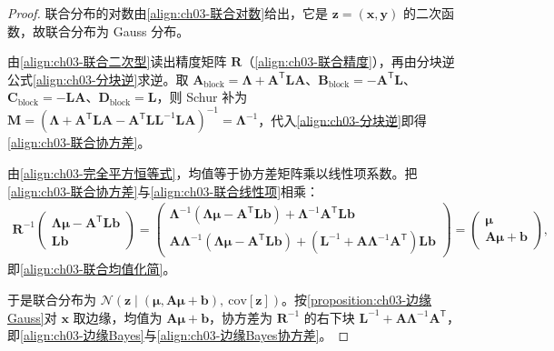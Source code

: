\documentclass[../../main.tex]{subfiles}
\begin{document}
\begin{proof}
联合分布的对数由\eqref{align:ch03-联合对数}给出，它是 $\boldsymbol{z}=(\boldsymbol{x},\boldsymbol{y})$ 的二次函数，故联合分布为 Gauss 分布。

由\eqref{align:ch03-联合二次型}读出精度矩阵 $\boldsymbol{R}$（\eqref{align:ch03-联合精度}），再由分块逆公式\eqref{align:ch03-分块逆}求逆。取 $\boldsymbol{A}_{\text{block}}=\boldsymbol{\Lambda}+\boldsymbol{A}^{\mathsf{T}}\boldsymbol{L}\boldsymbol{A}$、$\boldsymbol{B}_{\text{block}}=-\boldsymbol{A}^{\mathsf{T}}\boldsymbol{L}$、$\boldsymbol{C}_{\text{block}}=-\boldsymbol{L}\boldsymbol{A}$、$\boldsymbol{D}_{\text{block}}=\boldsymbol{L}$，则 Schur 补为 $\boldsymbol{M}=(\boldsymbol{\Lambda}+\boldsymbol{A}^{\mathsf{T}}\boldsymbol{L}\boldsymbol{A}-\boldsymbol{A}^{\mathsf{T}}\boldsymbol{L}\boldsymbol{L}^{-1}\boldsymbol{L}\boldsymbol{A})^{-1}=\boldsymbol{\Lambda}^{-1}$，代入\eqref{align:ch03-分块逆}即得\eqref{align:ch03-联合协方差}。

由\eqref{align:ch03-完全平方恒等式}，均值等于协方差矩阵乘以线性项系数。把\eqref{align:ch03-联合协方差}与\eqref{align:ch03-联合线性项}相乘：
\begin{align*}
\boldsymbol{R}^{-1}\begin{pmatrix}\boldsymbol{\Lambda}\boldsymbol{\mu}-\boldsymbol{A}^{\mathsf{T}}\boldsymbol{L}\boldsymbol{b}\\ \boldsymbol{L}\boldsymbol{b}\end{pmatrix}=\begin{pmatrix}\boldsymbol{\Lambda}^{-1}(\boldsymbol{\Lambda}\boldsymbol{\mu}-\boldsymbol{A}^{\mathsf{T}}\boldsymbol{L}\boldsymbol{b})+\boldsymbol{\Lambda}^{-1}\boldsymbol{A}^{\mathsf{T}}\boldsymbol{L}\boldsymbol{b}\\ \boldsymbol{A}\boldsymbol{\Lambda}^{-1}(\boldsymbol{\Lambda}\boldsymbol{\mu}-\boldsymbol{A}^{\mathsf{T}}\boldsymbol{L}\boldsymbol{b})+(\boldsymbol{L}^{-1}+\boldsymbol{A}\boldsymbol{\Lambda}^{-1}\boldsymbol{A}^{\mathsf{T}})\boldsymbol{L}\boldsymbol{b}\end{pmatrix}=\begin{pmatrix}\boldsymbol{\mu}\\ \boldsymbol{A}\boldsymbol{\mu}+\boldsymbol{b}\end{pmatrix},
\end{align*}
即\eqref{align:ch03-联合均值化简}。

于是联合分布为 $\mathcal{N}(\boldsymbol{z}\mid(\boldsymbol{\mu},\boldsymbol{A}\boldsymbol{\mu}+\boldsymbol{b}),\ \mathrm{cov}[\boldsymbol{z}])$。按\cref{proposition:ch03-边缘Gauss}对 $\boldsymbol{x}$ 取边缘，均值为 $\boldsymbol{A}\boldsymbol{\mu}+\boldsymbol{b}$，协方差为 $\boldsymbol{R}^{-1}$ 的右下块 $\boldsymbol{L}^{-1}+\boldsymbol{A}\boldsymbol{\Lambda}^{-1}\boldsymbol{A}^{\mathsf{T}}$，即\eqref{align:ch03-边缘Bayes}与\eqref{align:ch03-边缘Bayes协方差}。


\end{proof}
\end{document}
